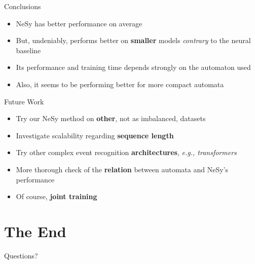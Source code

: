 \documentclass[10pt, aspectratio=169]{beamer}
\begin{document}
\begin{frame}{Conclusions}
    \begin{itemize}
        \setlength{\itemsep}{13pt}
        \item NeSy has better performance on average
        \item But, undeniably, performs better on \textbf{smaller} models \textit{contrary} to the neural baseline
        \item Its performance and training time depends strongly on the automaton used
        \item Also, it seems to be performing better for more compact automata
        \end{itemize}
    \end{frame}

\begin{frame}{Future Work}
    \begin{itemize}
        \setlength{\itemsep}{13pt}
        \item Try our NeSy method on \textbf{other}, not as imbalanced, datasets
        \item Investigate scalability regarding \textbf{sequence length}
        \item Try other complex event recognition \textbf{architectures}, \textit{e.g., transformers}
        \item More thorough check of the \textbf{relation} between automata and NeSy's performance
        \item Of course, \textbf{joint training}
        \end{itemize}
    \end{frame}


\section{The End}

\begin{frame}
    \begin{center}
        \huge {} 
        
        Questions?
    \end{center}
    
\end{frame}
\end{document}
